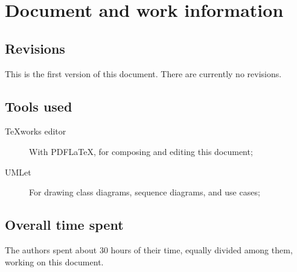 \chapter{Document and work information}

\section{Revisions}
This is the first version of this document. There are currently no revisions.

\section{Tools used}
\begin{description}
\item[TeXworks editor] With PDF\LaTeX{}, for composing and editing this document;
\item[UMLet] For drawing class diagrams, sequence diagrams, and use cases;
\end{description}

\section{Overall time spent}
The authors spent about 30 hours of their time, equally divided among them, working on this document.